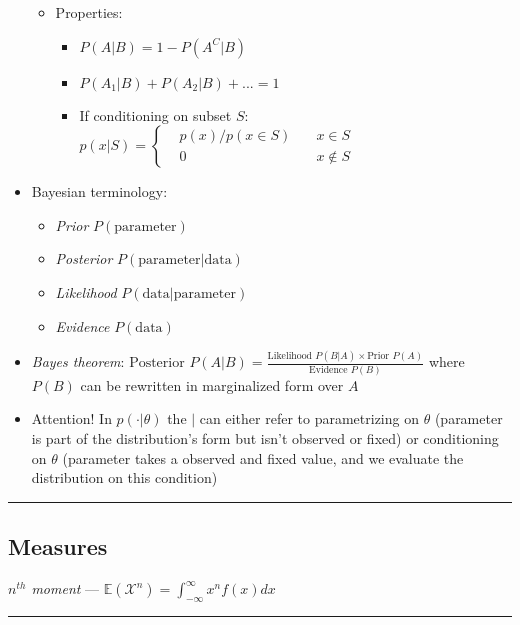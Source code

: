 \begin{itemize}
\begin{itemize}
        \item Properties:
        \begin{itemize}
            \item $P(A|B) = 1 - P(A^C|B)$
            \item $P(A_1|B) + P(A_2|B) + ... = 1$
            \item If conditioning on subset $S$:
            $p(x | S) = 
            \left\{
                \begin{aligned}
                     & p(x) / p(x \in S) \quad & x \in S \\ 
                     & 0 \quad & x \notin S  
                \end{aligned}
            \right.$
        \end{itemize}
    \end{itemize}
    \item Bayesian terminology: 
    \begin{itemize}
        \item \emph{Prior} $P(\textrm{parameter})$
        \item \emph{Posterior} $P(\textrm{parameter} | \textrm{data})$
        \item \emph{Likelihood} $P(\textrm{data} | \textrm{parameter})$
        \item \emph{Evidence} $P(\textrm{data})$
    \end{itemize}
    \item \emph{Bayes theorem}: $\textrm{Posterior } P(A|B) = \frac{\textrm{Likelihood }P(B|A) \times  \textrm{Prior }P(A)}{\textrm{Evidence }P(B)}$ where $P(B)$ can be rewritten in marginalized form over $A$
    \item Attention! In $p(\cdot | \theta)$ the $|$ can either refer to parametrizing on $\theta$ (parameter is part of the distribution's form but isn't observed or fixed) or conditioning on $\theta$ (parameter takes a observed and fixed value, and we evaluate the distribution on this condition)
\end{itemize}

{\color{black}\hrule height 0.001mm}

\subsection*{Measures}
\emph{$n^{th}$ moment} --- 
$\mathbb{E}(\mathcal{X}^n) = \int_{-\infty}^{\infty}x^n f(x)dx$

{\color{lightgray}\hrule height 0.001mm}

